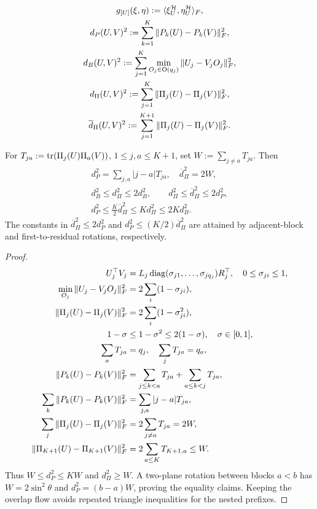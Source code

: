 \begin{definition}
\begin{gather}
 g_{[U]}(\xi,\eta):=\langle\xi_U^{\mathcal H},\eta_U^{\mathcal H}\rangle_F,\\
 d_P(U,V)^2:=\sum_{k=1}^K\|P_k(U)-P_k(V)\|_F^2,
 \label{eq:tf-distance}\\
 d_B(U,V)^2:=\sum_{j=1}^K\min_{O_j\in\mathrm O(q_j)}
                    \|U_j-V_jO_j\|_F^2,\\
 d_\Pi(U,V)^2:=\sum_{j=1}^K\|\Pi_j(U)-\Pi_j(V)\|_F^2,\\
 \overline d_\Pi(U,V)^2:=\sum_{j=1}^{K+1}\|\Pi_j(U)-\Pi_j(V)\|_F^2.
\end{gather}
\end{definition}
\begin{lemma}\label{lem:rigid-metrics}
For $T_{ja}:=\operatorname{tr}(\Pi_j(U)\Pi_a(V))$, $1\le j,a\le K+1$, set
$W:=\sum_{j\ne a}T_{ja}$. Then
\begin{gather}
 d_P^2=\sum_{j,a}|j-a|T_{ja},\quad\overline d_\Pi^2=2W,\\
 d_B^2\le d_\Pi^2\le2d_B^2,\qquad
 d_\Pi^2\le\overline d_\Pi^2\le2d_P^2,\\
 d_P^2\le\frac K2\overline d_\Pi^2\le Kd_\Pi^2\le2K d_B^2.
\end{gather}
The constants in $\overline d_\Pi^2\le2d_P^2$ and
$d_P^2\le(K/2)\overline d_\Pi^2$ are attained by adjacent-block and
first-to-residual rotations, respectively.
\end{lemma}
\begin{proof}
\begin{align}
 U_j^\top V_j&=L_j\operatorname{diag}(\sigma_{j1},\ldots,\sigma_{jq_j})R_j^\top,
 \quad0\le\sigma_{ji}\le1,\\
 \min_{O_j}\|U_j-V_jO_j\|_F^2&=2\sum_i(1-\sigma_{ji}),\\
 \|\Pi_j(U)-\Pi_j(V)\|_F^2&=2\sum_i(1-\sigma_{ji}^2),\\
 1-\sigma&\le1-\sigma^2\le2(1-\sigma),\quad\sigma\in[0,1],\\
 \sum_aT_{ja}&=q_j,\quad\sum_jT_{ja}=q_a,\\
 \|P_k(U)-P_k(V)\|_F^2
 &=\sum_{j\le k<a}T_{ja}+\sum_{a\le k<j}T_{ja},\\
 \sum_k\|P_k(U)-P_k(V)\|_F^2&=\sum_{j,a}|j-a|T_{ja},\\
 \sum_j\|\Pi_j(U)-\Pi_j(V)\|_F^2&=2\sum_{j\ne a}T_{ja}=2W,\\
 \|\Pi_{K+1}(U)-\Pi_{K+1}(V)\|_F^2
 &=2\sum_{a\le K}T_{K+1,a}\le W.
\end{align}
Thus $W\le d_P^2\le KW$ and $d_\Pi^2\ge W$. A two-plane rotation between
blocks $a<b$ has $W=2\sin^2\theta$ and $d_P^2=(b-a)W$, proving the equality
claims. Keeping the overlap flow avoids repeated triangle inequalities for
the nested prefixes.
\end{proof}
